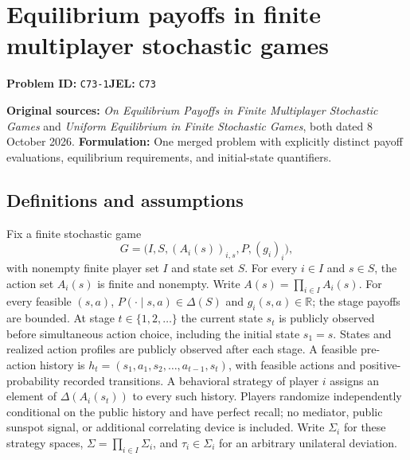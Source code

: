 \documentclass[11pt,a4paper]{article}
\newcommand{\R}{\mathbb R}
\begin{document}
\section*{Equilibrium payoffs in finite multiplayer stochastic games}
\textbf{Problem ID:} \texttt{C73-1}\quad \textbf{JEL:} \texttt{C73}\par
\label{problem:OP-0590}
\label{supp:stochastic-games}

\noindent\textbf{Original sources:} \emph{On Equilibrium Payoffs in Finite
	Multiplayer Stochastic Games} and \emph{Uniform Equilibrium in Finite
	Stochastic Games}, both dated 8 October 2026.
\textbf{Formulation:} One merged problem with explicitly distinct
payoff evaluations, equilibrium requirements, and initial-state quantifiers.

\subsection*{Definitions and assumptions}

Fix a finite stochastic game
\[
G=\bigl(I,S,(A_i(s))_{i,s},P,(g_i)_i\bigr),
\]
with nonempty finite player set $I$ and state set $S$. For every
$i\in I$ and $s\in S$, the action set $A_i(s)$ is finite and nonempty.
Write $A(s)=\prod_{i\in I}A_i(s)$. For every feasible $(s,a)$,
$P(\cdot\mid s,a)\in\Delta(S)$ and $g_i(s,a)\in\R$; the stage
payoffs are bounded. At stage $t\in\{1,2,\ldots\}$ the current
state $s_t$ is publicly observed before simultaneous action choice,
including the initial state $s_1=s$. States and realized action
profiles are publicly observed after each stage. A feasible pre-action
history is $h_t=(s_1,a_1,s_2,\ldots,a_{t-1},s_t)$, with feasible
actions and positive-probability recorded transitions. A behavioral
strategy of player $i$ assigns an element of $\Delta(A_i(s_t))$ to
every such history. Players randomize independently conditional on the
public history and have perfect recall; no mediator, public sunspot
signal, or additional correlating device is included. Write $\Sigma_i$
for these strategy spaces, $\Sigma=\prod_{i\in I}\Sigma_i$, and
$\tau_i\in\Sigma_i$ for an arbitrary unilateral deviation.
\end{document}
